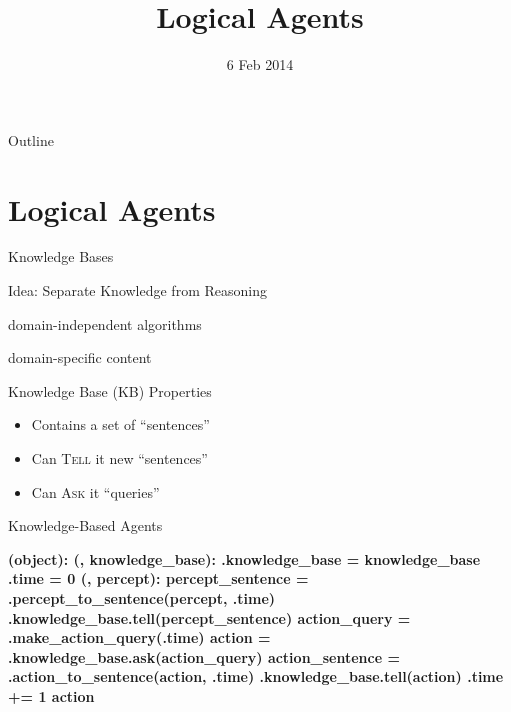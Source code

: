 \documentclass[14pt]{beamer}
\title{Logical Agents}
\date{6 Feb 2014}
\begin{document}
\begin{frame}
  \titlepage
\end{frame}


\begin{frame}{Outline}
  \tableofcontents
\end{frame}


\section{Logical Agents}

\begin{frame}{Knowledge Bases}
\begin{block}{Idea: Separate Knowledge from Reasoning}
\begin{description}
\item[Inference Engine:] domain-independent algorithms
\item[Knowledge Base:] domain-specific content
\end{description}
\end{block}
\pause
\begin{block}{Knowledge Base (KB) Properties}
\begin{itemize}
\item Contains a set of ``sentences''
\item Can \textsc{Tell} it new ``sentences''
\item Can \textsc{Ask} it ``queries''
\end{itemize}
\end{block}
\end{frame}
\begin{frame}[fragile]{Knowledge-Based Agents}
	\begin{semiverbatim}\bfseries\scriptsize
		 (object):\pause
		     (, knowledge_base):
		        .knowledge_base = knowledge_base
		        .time = 0
		     (, percept):
		        \pause{}
		        percept_sentence = .percept_to_sentence(percept, .time)
		        .knowledge_base.tell(percept_sentence)
		        \pause{}
		        action_query = .make_action_query(.time)
		        action = .knowledge_base.ask(action_query)
		        \pause{}
		        action_sentence = .action_to_sentence(action, .time)
		        .knowledge_base.tell(action)
		        .time += 1
		        \pause{}
		         action
	\end{semiverbatim}
\end{frame}
\end{document}
